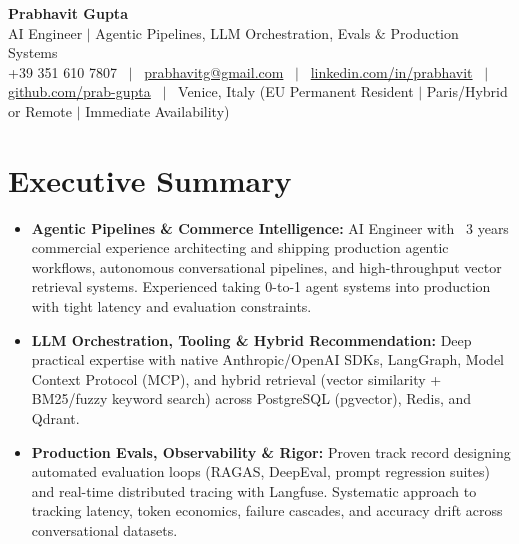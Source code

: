 \documentclass[a4paper,10pt]{article}
\begin{document}
\begin{minipage}[c]{0.80\textwidth}
  {\Huge\bfseries Prabhavit Gupta}\\[3pt]
  {\color{accent}\large AI Engineer $\vert$ Agentic Pipelines, LLM Orchestration, Evals $\&$ Production Systems}\\[6pt]
  {\footnotesize +39 351 610 7807 ~$\vert$~
  \href{mailto:prabhavitg@gmail.com}{prabhavitg@gmail.com} ~$\vert$~
  \href{https://www.linkedin.com/in/prabhavit/}{linkedin.com/in/prabhavit} ~$\vert$~
  \href{https://github.com/prab-gupta}{github.com/prab-gupta} ~$\vert$~
  Venice, Italy (EU Permanent Resident $\vert$ Paris/Hybrid or Remote $\vert$ Immediate Availability)}
\end{minipage}\hfill

\vspace{6pt}

\section{Executive Summary}
\begin{itemize}
  \item \textbf{Agentic Pipelines \& Commerce Intelligence:} AI Engineer with ~3 years commercial experience architecting and shipping production agentic workflows, autonomous conversational pipelines, and high-throughput vector retrieval systems. Experienced taking 0-to-1 agent systems into production with tight latency and evaluation constraints.
  \item \textbf{LLM Orchestration, Tooling \& Hybrid Recommendation:} Deep practical expertise with native Anthropic/OpenAI SDKs, LangGraph, Model Context Protocol (MCP), and hybrid retrieval (vector similarity + BM25/fuzzy keyword search) across PostgreSQL (pgvector), Redis, and Qdrant.
  \item \textbf{Production Evals, Observability \& Rigor:} Proven track record designing automated evaluation loops (RAGAS, DeepEval, prompt regression suites) and real-time distributed tracing with Langfuse. Systematic approach to tracking latency, token economics, failure cascades, and accuracy drift across conversational datasets.
\end{itemize}

\end{document}
